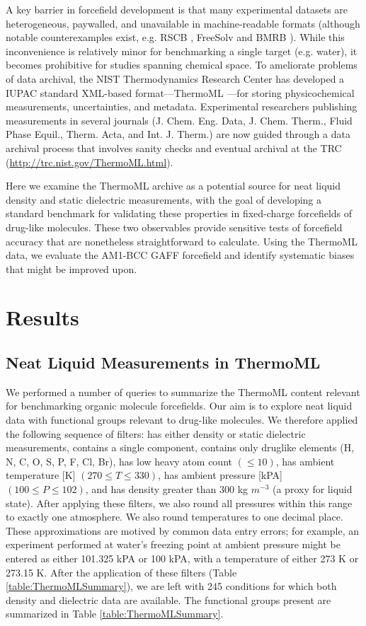 \documentclass[journal=jacsat,manuscript=article]{achemso}
\begin{document}
A key barrier in forcefield development is that many experimental datasets are heterogeneous, paywalled, and unavailable in machine-readable formats (although notable counterexamples exist, e.g. RSCB \cite{}, FreeSolv \cite{} and BMRB \cite{}).  While this inconvenience is relatively minor for benchmarking a single target (e.g. water), it becomes prohibitive for studies spanning chemical space.  To ameliorate problems of data archival, the NIST Thermodynamics Research Center has developed a IUPAC standard XML-based format---ThermoML \cite{}---for storing physicochemical measurements, uncertainties, and metadata.  Experimental researchers publishing measurements in several journals (J. Chem. Eng. Data, J. Chem. Therm., Fluid Phase Equil., Therm. Acta, and Int. J. Therm.) are now guided through a data archival process that involves sanity checks and eventual archival at the TRC (\url{http://trc.nist.gov/ThermoML.html}).  

Here we examine the ThermoML archive as a potential source for neat liquid density and static dielectric measurements, with the goal of developing a standard benchmark for validating these properties in fixed-charge forcefields of drug-like molecules.  These two observables provide sensitive tests of forcefield accuracy that are nonetheless straightforward to calculate.  Using the ThermoML data, we evaluate the AM1-BCC GAFF forcefield \cite{gaff} and identify systematic biases that might be improved upon.

\section{Results}

\subsection{Neat Liquid Measurements in ThermoML}

We performed a number of queries to summarize the ThermoML content relevant for benchmarking organic molecule forcefields.  Our aim is to explore neat liquid data with functional groups relevant to drug-like molecules.  We therefore applied the following sequence of filters: has either density or static dielectric measurements, contains a single component, contains only druglike elements (H, N, C, O, S, P, F, Cl, Br), has low heavy atom count $(\le 10)$, has ambient temperature [K] $(270 \le T \le 330)$, has ambient pressure [kPA] $(100 \le P \le 102)$, and has density greater than 300 kg $m^{-3}$ (a proxy for liquid state).  After applying these filters, we also round all pressures within this range to exactly one atmosphere.  We also round temperatures to one decimal place.  These approximations are motived by common data entry errors; for example, an experiment performed at water's freezing point at ambient pressure might be entered as either 101.325 kPA or 100 kPA, with a temperature of either 273 K or 273.15 K.  After the application of these filters (Table \ref{table:ThermoMLSummary}), we are left with 245 conditions for which both density and dielectric data are available.  The functional groups present are summarized in Table \ref{table:ThermoMLSummary}.  
\end{document}
